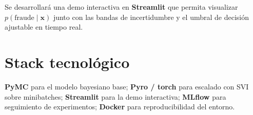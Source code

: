 \documentclass[11pt, a4paper]{article}
\begin{document}
\vspace{0.3cm}
Se desarrollará una demo interactiva en \textbf{Streamlit} que permita visualizar $p(\text{fraude} \mid \mathbf{x})$ junto con las bandas de incertidumbre y el umbral de decisión ajustable en tiempo real.

\section{Stack tecnológico}

\textbf{PyMC} para el modelo bayesiano base; \textbf{Pyro / torch} para escalado con SVI sobre minibatches; \textbf{Streamlit} para la demo interactiva; \textbf{MLflow} para seguimiento de experimentos; \textbf{Docker} para reproducibilidad del entorno.
\end{document}
